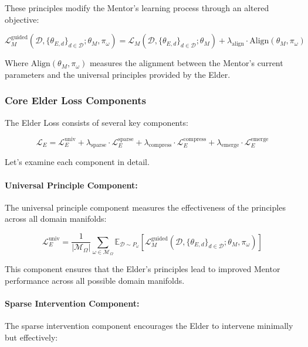 These principles modify the Mentor's learning process through an altered objective:

\begin{equation}
\mathcal{L}_{M}^{\text{guided}}(\mathcal{D}, \{\theta_{E,d}\}_{d \in \mathcal{D}}; \theta_M, \pi_{\omega}) = \mathcal{L}_M(\mathcal{D}, \{\theta_{E,d}\}_{d \in \mathcal{D}}; \theta_M) + \lambda_{\text{align}} \cdot \text{Align}(\theta_M, \pi_{\omega})
\end{equation}

Where $\text{Align}(\theta_M, \pi_{\omega})$ measures the alignment between the Mentor's current parameters and the universal principles provided by the Elder.

\subsubsection{Core Elder Loss Components}

The Elder Loss consists of several key components:

\begin{equation}
\mathcal{L}_E = \mathcal{L}_E^{\text{univ}} + \lambda_{\text{sparse}} \cdot \mathcal{L}_E^{\text{sparse}} + \lambda_{\text{compress}} \cdot \mathcal{L}_E^{\text{compress}} + \lambda_{\text{emerge}} \cdot \mathcal{L}_E^{\text{emerge}}
\end{equation}

Let's examine each component in detail.

\paragraph{Universal Principle Component:}
The universal principle component measures the effectiveness of the principles across all domain manifolds:

\begin{equation}
\mathcal{L}_E^{\text{univ}} = \frac{1}{|\mathcal{M}_{\Omega}|} \sum_{\omega \in \mathcal{M}_{\Omega}} \mathbb{E}_{\mathcal{D} \sim P_{\omega}} [\mathcal{L}_{M}^{\text{guided}}(\mathcal{D}, \{\theta_{E,d}\}_{d \in \mathcal{D}}; \theta_M, \pi_{\omega})]
\end{equation}

This component ensures that the Elder's principles lead to improved Mentor performance across all possible domain manifolds.

\paragraph{Sparse Intervention Component:}
The sparse intervention component encourages the Elder to intervene minimally but effectively:

